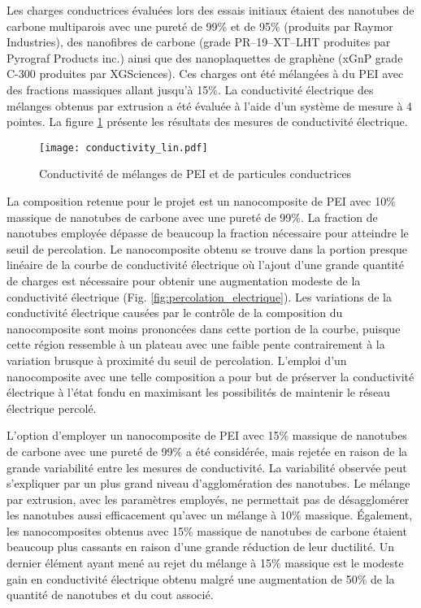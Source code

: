Les charges conductrices évaluées lors des essais initiaux étaient des nanotubes de carbone multiparois avec une pureté de 99\% et de 95\% (produits par Raymor Industries), des nanofibres de carbone (grade PR--19--XT--LHT produites par Pyrograf Products inc.) ainsi que des nanoplaquettes de graphène (xGnP grade C-300 produites par XGSciences). 
Ces charges ont été mélangées à du PEI avec des fractions massiques allant jusqu'à 15\%.
La conductivité électrique des mélanges obtenus par extrusion a été évaluée à l'aide d'un système de mesure à 4 pointes. 
La figure \ref{fig:conductivite_lin} présente les résultats des mesures de conductivité électrique. 

\begin{figure}[h]
	\centering
	\texttt{[image: conductivity\_lin.pdf]}
	\caption{Conductivité de mélanges de PEI et de particules conductrices}
	\label{fig:conductivite_lin}
\end{figure}

La composition retenue pour le projet est un nanocomposite de PEI avec 10\% massique de nanotubes de carbone avec une pureté de 99\%. 
La fraction de nanotubes employée dépasse de beaucoup la fraction nécessaire pour atteindre le seuil de percolation.
Le nanocomposite obtenu se trouve dans la portion presque linéaire de la courbe de conductivité électrique où l'ajout d'une grande quantité de charges est nécessaire pour obtenir une augmentation modeste de la conductivité électrique (Fig. \ref{fig:percolation_electrique}). 
Les variations de la conductivité électrique causées par le contrôle de la composition du nanocomposite sont moins prononcées dans cette portion de la courbe, puisque cette région ressemble à un plateau avec une faible pente contrairement à la variation brusque à proximité du seuil de percolation. 
L'emploi d'un nanocomposite avec une telle composition a pour but de préserver la conductivité électrique à l'état fondu en maximisant les possibilités de maintenir le réseau électrique percolé. 

L'option d'employer un nanocomposite de PEI avec 15\% massique de nanotubes de carbone avec une pureté de 99\% a été considérée, mais rejetée en raison de la grande variabilité entre les mesures de conductivité. 
La variabilité observée peut s'expliquer par un plus grand niveau d'agglomération des nanotubes.  
Le mélange par extrusion, avec les paramètres employés, ne permettait pas de désagglomérer les nanotubes aussi efficacement qu'avec un mélange à 10\% massique. 
Également, les nanocomposites obtenus avec 15\% massique de nanotubes de carbone étaient beaucoup plus cassants en raison d'une grande réduction de leur ductilité. 
Un dernier élément ayant mené au rejet du mélange à 15\% massique est le modeste gain en conductivité électrique obtenu malgré une augmentation de 50\% de la quantité de nanotubes et du cout associé. 

